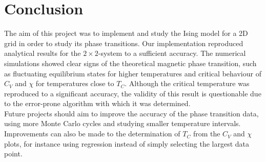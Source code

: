 \documentclass[notitlepage, reprint, nofootinbib]{revtex4-1}
\begin{document}
\section{Conclusion}
The aim of this project was to implement and study the Ising model for a 2D grid in order to study its phase transitions. Our implementation reproduced analytical results for the $2\times2$-system to a sufficient accuracy. The numerical simulations showed clear signs of the theoretical magnetic phase transition, such as fluctuating equilibrium states for higher temperatures and critical behaviour of $C_V$ and $\chi$ for temperatures close to $T_C$. Although the critical temperature was reproduced to a significant accuracy, the validity of this result is questionable due to the error-prone algorithm with which it was determined. \\[2mm]
Future projects should aim to improve the accuracy of the phase transition data, using more Monte Carlo cycles and studying smaller temperature intervals. Improvements can also be made to the determination of $T_C$ from the $C_V$ and $\chi$ plots, for instance using regression instead of simply selecting the largest data point.

\onecolumngrid


\end{document}
